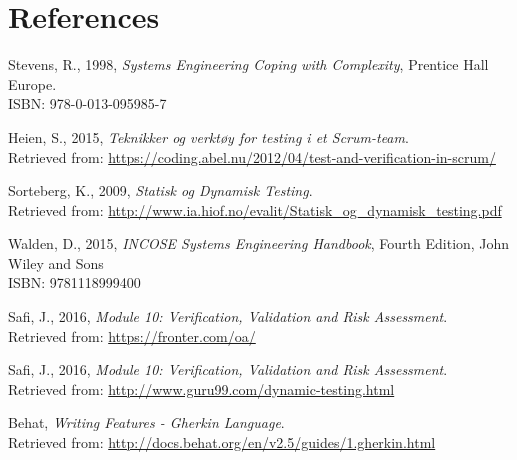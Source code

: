 \section{References}
\begin{thebibliography}{10}
    Stevens, R., 1998, \textit{Systems Engineering Coping with Complexity}, Prentice Hall Europe. \\
    \qquad ISBN: 978-0-013-095985-7
    
    Heien, S., 2015, \textit{Teknikker og verktøy for testing i et Scrum-team}. \\
    \qquad Retrieved from: \url{https://coding.abel.nu/2012/04/test-and-verification-in-scrum/}
    
    Sorteberg, K., 2009, \textit{Statisk og Dynamisk Testing}. \\
    \qquad Retrieved from: \url{http://www.ia.hiof.no/evalit/Statisk_og_dynamisk_testing.pdf}
    
    Walden, D., 2015, \textit{INCOSE Systems Engineering Handbook}, Fourth Edition, John Wiley and Sons\\
    \qquad ISBN: 9781118999400 
    
    Safi, J., 2016, \textit{Module 10: Verification, Validation and Risk Assessment}. \\
    \qquad Retrieved from: \url{https://fronter.com/oa/}
    
    Safi, J., 2016, \textit{Module 10: Verification, Validation and Risk Assessment}. \\
    \qquad Retrieved from: \url{http://www.guru99.com/dynamic-testing.html}
    
    Behat, \textit{Writing Features - Gherkin Language}. \\
    \qquad Retrieved from: \url{http://docs.behat.org/en/v2.5/guides/1.gherkin.html}
    
    
\end{thebibliography}
    
    
    




